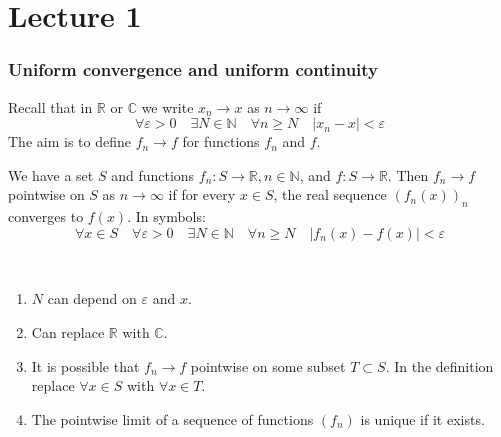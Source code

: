 \documentclass[a4paper]{article}
\begin{document}
\maketitle
\tableofcontents
\newpage
\part*{Lecture 1}
\section{Uniform convergence and uniform continuity}
Recall that in $\mathbb{R}$ or $\mathbb{C}$ we write $x_{n} \rightarrow x$ as $n \rightarrow \infty$ if
\[
\forall \varepsilon>0 \quad \exists N \in \mathbb{N} \quad \forall n \geqslant N \quad\left|x_{n}-x\right|<\varepsilon
\]
The aim is to define $f_{n} \rightarrow f$ for functions $f_{n}$ and $f$.

\begin{definition}
    We have a set $S$ and functions $f_{n}: S \rightarrow \mathbb{R}, n \in \mathbb{N}$, and $f: S \rightarrow \mathbb{R}$. Then $f_{n} \rightarrow f$ pointwise on $S$ as $n \rightarrow \infty$ if for every $x \in S$, the real sequence $\left(f_{n}(x)\right)_{n}$ converges to $f(x)$. In symbols:
    \[
    \forall x \in S \quad \forall \varepsilon>0 \quad \exists N \in \mathbb{N} \quad \forall n \geqslant N \quad\left|f_{n}(x)-f(x)\right|<\varepsilon
    \]
\end{definition}

\begin{remark}\
    \begin{enumerate}
        \item  $N$ can depend on $\varepsilon$ and $x$.
        \item Can replace $\mathbb{R}$ with $\mathbb{C}$.
        \item It is possible that $f_{n} \rightarrow f$ pointwise on some subset $T \subset S$. In the definition replace $\forall x \in S$ with $\forall x \in T$.
        \item The pointwise limit of a sequence of functions $(f_n)$ is unique if it exists.
    \end{enumerate}
\end{remark}
\end{document}
